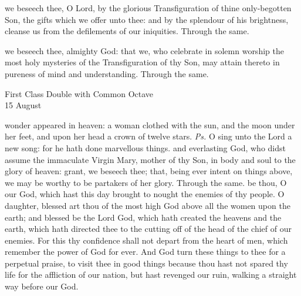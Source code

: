 
\secret
{} we beseech thee, O Lord, by the glorious Transfiguration of thine only-begotten Son, the gifts which we offer unto thee: and by the splendour of his brightness, cleanse us from the defilements of our iniquities. Through the same.


\postcommunion
{} we beseech thee, almighty God: that we, who celebrate in solemn worship the most holy mysteries of the Transfiguration of thy Son, may attain thereto in pureness of mind and understanding. Through the same.

\begin{inhead}
    {First Class Double with Common Octave\\
15 August}
\end{inhead}

\introit
{} wonder appeared in heaven: a woman clothed with the sun, and the moon under her feet, and upon her head a crown of twelve stars. \textit{Ps.} O sing unto the Lord a new song: for he hath done marvellous things.
\collect
{} and everlasting God, who didst assume the immaculate Virgin Mary, mother of thy Son, in body and soul to the glory of heaven: grant, we beseech thee; that, being ever intent on things above, we may be worthy to be partakers of her glory. Through the same.
 be thou, O our God, which hast this day brought to nought the enemies of thy people. O daughter, blessed art thou of the most high God above all the women upon the earth; and blessed be the Lord God, which hath created the heavens and the earth, which hath directed thee to the cutting off of the head of the chief of our enemies. For this thy confidence shall not depart from the heart of men, which remember the power of God for ever. And God turn these things to thee for a perpetual praise, to visit thee in good things because thou hast not spared thy life for the affliction of our nation, but hast revenged our ruin, walking a straight way before our God.

